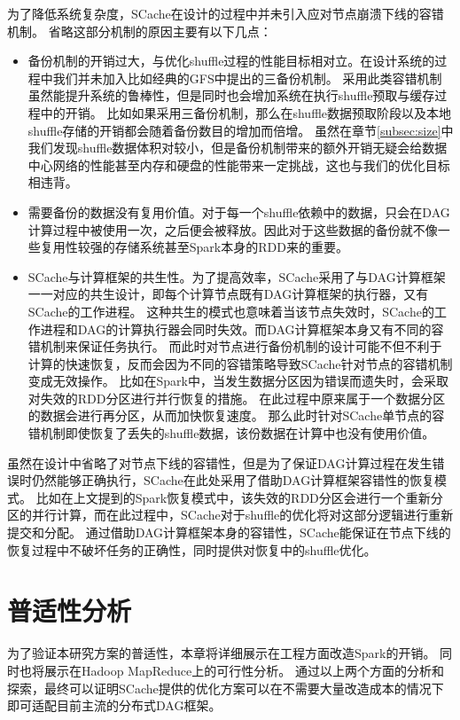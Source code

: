 为了降低系统复杂度，SCache在设计的过程中并未引入应对节点崩溃下线的容错机制。
省略这部分机制的原因主要有以下几点：
\begin{itemize}
    \item 备份机制的开销过大，与优化shuffle过程的性能目标相对立。在设计系统的过程中我们并未加入比如经典的GFS\cite{gfs}中提出的三备份机制。
    采用此类容错机制虽然能提升系统的鲁棒性，但是同时也会增加系统在执行shuffle预取与缓存过程中的开销。
    比如如果采用三备份机制，那么在shuffle数据预取阶段以及本地shuffle存储的开销都会随着备份数目的增加而倍增。
    虽然在章节\ref{subsec:size}中我们发现shuffle数据体积对较小，但是备份机制带来的额外开销无疑会给数据中心网络的性能甚至内存和硬盘的性能带来一定挑战，这也与我们的优化目标相违背。
    \item 需要备份的数据没有复用价值。对于每一个shuffle依赖中的数据，只会在DAG计算过程中被使用一次，之后便会被释放。因此对于这些数据的备份就不像一些复用性较强的存储系统甚至Spark本身的RDD来的重要。
    \item SCache与计算框架的共生性。为了提高效率，SCache采用了与DAG计算框架一一对应的共生设计，即每个计算节点既有DAG计算框架的执行器，又有SCache的工作进程。
    这种共生的模式也意味着当该节点失效时，SCache的工作进程和DAG的计算执行器会同时失效。而DAG计算框架本身又有不同的容错机制来保证任务执行。
    而此时对节点进行备份机制的设计可能不但不利于计算的快速恢复，反而会因为不同的容错策略导致SCache针对节点的容错机制变成无效操作。
    比如在Spark中，当发生数据分区因为错误而遗失时，会采取对失效的RDD分区进行并行恢复的措施。
    在此过程中原来属于一个数据分区的数据会进行再分区，从而加快恢复速度。
    那么此时针对SCache单节点的容错机制即使恢复了丢失的shuffle数据，该份数据在计算中也没有使用价值。
\end{itemize}

虽然在设计中省略了对节点下线的容错性，但是为了保证DAG计算过程在发生错误时仍然能够正确执行，SCache在此处采用了借助DAG计算框架容错性的恢复模式。
比如在上文提到的Spark恢复模式中，该失效的RDD分区会进行一个重新分区的并行计算，而在此过程中，SCache对于shuffle的优化将对这部分逻辑进行重新提交和分配。
通过借助DAG计算框架本身的容错性，SCache能保证在节点下线的恢复过程中不破坏任务的正确性，同时提供对恢复中的shuffle优化。

\section{普适性分析}
\label{sec:impl}

为了验证本研究方案的普适性，本章将详细展示在工程方面改造Spark的开销。
同时也将展示在Hadoop MapReduce上的可行性分析。
通过以上两个方面的分析和探索，最终可以证明SCache提供的优化方案可以在不需要大量改造成本的情况下即可适配目前主流的分布式DAG框架。

